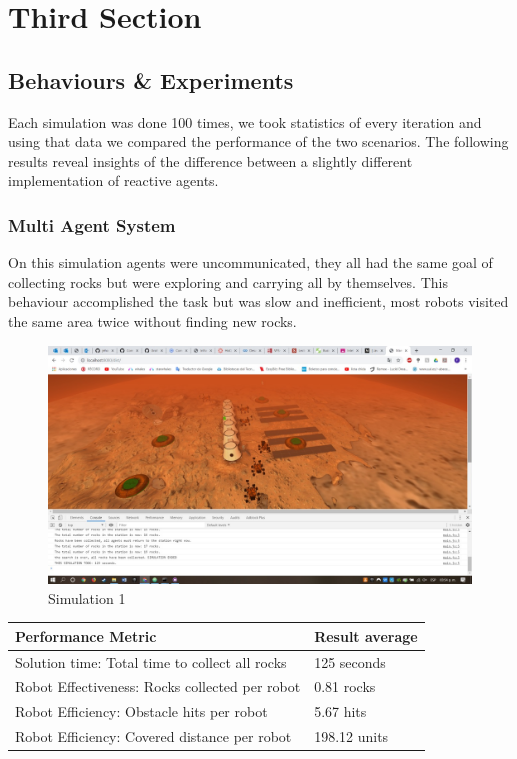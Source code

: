 \documentclass[runningheads]{llncs}
\begin{document}
\section{Third Section}
\subsection{Behaviours \& Experiments}

Each simulation was done 100 times, we took statistics of every iteration and using that data we compared the performance of the two scenarios. The following results reveal insights of the difference between a slightly different implementation of reactive agents.

\subsubsection{Multi Agent System}

On this simulation agents were uncommunicated, they all had the same goal of collecting rocks but were exploring and carrying all by themselves. This behaviour accomplished the task but was slow and inefficient, most robots visited the same area twice without finding new rocks.

\begin{figure}[htp]
\centering
\includegraphics[width=\textwidth,height=\textheight,keepaspectratio]{result.jpeg}
\caption{Simulation 1}
\label{Final state screenshot of the simulation}
\end{figure}

\begin{center}

\begin{tabularx}{\textwidth}{X|l}
  \textbf{Performance Metric} & \textbf{Result average} \\
\hline
Solution time: Total time to collect all rocks & 125 seconds\\
Robot Effectiveness: Rocks collected per robot & 0.81 rocks\\
Robot Efficiency: Obstacle hits per robot & 5.67 hits\\
Robot Efficiency: Covered distance per robot & 198.12 units\\
\end{tabularx}
\end{center}
\end{document}

